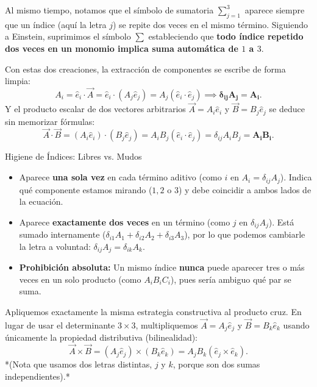\documentclass[11pt,letterpaper]{article}
\begin{document}
Al mismo tiempo, notamos que el símbolo de sumatoria $\sum_{j=1}^3$ aparece siempre que un índice (aquí la letra $j$) se repite dos veces en el mismo término. Siguiendo a Einstein, suprimimos el símbolo $\sum$ estableciendo que \textbf{todo índice repetido dos veces en un monomio implica suma automática de $1$ a $3$}.

Con estas dos creaciones, la extracción de componentes se escribe de forma limpia:
\[
A_i = \hat{e}_i \cdot \vec{A} = \hat{e}_i \cdot (A_j \hat{e}_j) = A_j (\hat{e}_i \cdot \hat{e}_j) \implies \mathbf{\delta_{ij} A_j = A_i}.
\]
Y el producto escalar de dos vectores arbitrarios $\vec{A} = A_i \hat{e}_i$ y $\vec{B} = B_j \hat{e}_j$ se deduce sin memorizar fórmulas:
\[
\vec{A} \cdot \vec{B} = (A_i \hat{e}_i) \cdot (B_j \hat{e}_j) = A_i B_j (\hat{e}_i \cdot \hat{e}_j) = \delta_{ij} A_i B_j = \mathbf{A_i B_i}.
\]

\begin{infobox}[pureblack]{Higiene de Índices: Libres vs. Mudos}
\begin{itemize}
    \item {} Aparece \textbf{una sola vez} en cada término aditivo (como $i$ en $A_i = \delta_{ij} A_j$). Indica qué componente estamos mirando ($1, 2$ o $3$) y debe coincidir a ambos lados de la ecuación.
    \item {} Aparece \textbf{exactamente dos veces} en un término (como $j$ en $\delta_{ij} A_j$). Está sumado internamente ($\delta_{i1}A_1 + \delta_{i2}A_2 + \delta_{i3}A_3$), por lo que podemos cambiarle la letra a voluntad: $\delta_{ij} A_j = \delta_{ik} A_k$.
    \item \textbf{Prohibición absoluta:} Un mismo índice \textbf{nunca} puede aparecer tres o más veces en un solo producto (como $A_i B_i C_i$), pues sería ambiguo qué par se suma.
\end{itemize}
\end{infobox}


Apliquemos exactamente la misma estrategia constructiva al producto cruz. En lugar de usar el determinante $3\times 3$, multipliquemos $\vec{A} = A_j \hat{e}_j$ y $\vec{B} = B_k \hat{e}_k$ usando únicamente la propiedad distributiva (bilinealidad):
\[
\vec{A} \times \vec{B} = (A_j \hat{e}_j) \times (B_k \hat{e}_k) = A_j B_k (\hat{e}_j \times \hat{e}_k).
\]
*(Nota que usamos dos letras distintas, $j$ y $k$, porque son dos sumas independientes).*
\end{document}
